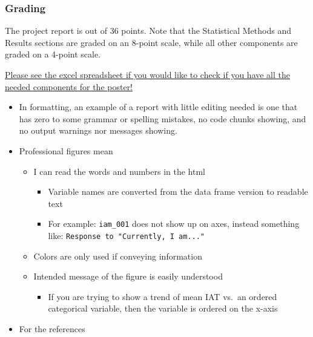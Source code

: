 \documentclass[
  letterpaper,
  DIV=11,
  numbers=noendperiod]{scrartcl}
\providecommand{\tightlist}{%
  \setlength{\itemsep}{0pt}\setlength{\parskip}{0pt}}\usepackage{longtable,booktabs,array}
\begin{document}
\subsubsection{Grading}\label{grading}

The project report is out of 36 points. Note that the Statistical
Methods and Results sections are graded on an 8-point scale, while all
other components are graded on a 4-point scale.

\href{https://ohsuitg-my.sharepoint.com/:x:/r/personal/wakim_ohsu_edu/_layouts/15/Doc.aspx?sourcedoc=\%7B1C6F4620-298D-4D42-A15E-8B5522E6A995\%7D&file=Project_Rubric.xlsx&action=default&mobileredirect=true}{Please
see the excel spreadsheet if you would like to check if you have all the
needed components for the poster!}

\begin{itemize}
\tightlist
\item
  In formatting, an example of a report with little editing needed is
  one that has zero to some grammar or spelling mistakes, no code chunks
  showing, and no output warnings nor messages showing.
\item
  Professional figures mean

  \begin{itemize}
  \tightlist
  \item
    I can read the words and numbers in the html

    \begin{itemize}
    \tightlist
    \item
      Variable names are converted from the data frame version to
      readable text
    \item
      For example: \texttt{iam\_001} does not show up on axes, instead
      something like: \texttt{Response\ to\ "Currently,\ I\ am..."}
    \end{itemize}
  \item
    Colors are only used if conveying information
  \item
    Intended message of the figure is easily understood

    \begin{itemize}
    \tightlist
    \item
      If you are trying to show a trend of mean IAT vs.~an ordered
      categorical variable, then the variable is ordered on the x-axis
    \end{itemize}
  \end{itemize}
\item
  For the references


\end{itemize}
\end{document}
